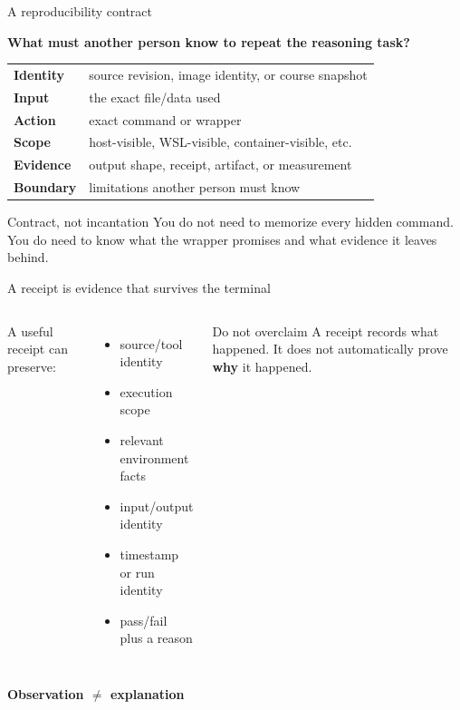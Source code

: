 \documentclass[aspectratio=169,11pt]{beamer}
\newcommand{\bigquestion}[1]{%
  \begin{center}
  \vspace{0.15em}
  {\Large\bfseries\color{DeepNavy}#1}
  \end{center}
}
\begin{document}
\begin{frame}{A reproducibility contract}
\bigquestion{What must another person know to repeat the reasoning task?}

\begin{center}
\begin{tabular}{>{\bfseries}p{3.0cm} p{8.3cm}}
\toprule
Identity & source revision, image identity, or course snapshot \\
Input & the exact file/data used \\
Action & exact command or wrapper \\
Scope & host-visible, WSL-visible, container-visible, etc. \\
Evidence & output shape, receipt, artifact, or measurement \\
Boundary & limitations another person must know \\
\bottomrule
\end{tabular}
\end{center}

\begin{block}{Contract, not incantation}
You do not need to memorize every hidden command. You do need to know what the wrapper promises and what evidence it leaves behind.
\end{block}
\end{frame}

\begin{frame}{A receipt is evidence that survives the terminal}
\begin{columns}[T,onlytextwidth]
A useful receipt can preserve:
\begin{itemize}
  \item source/tool identity
  \item execution scope
  \item relevant environment facts
  \item input/output identity
  \item timestamp or run identity
  \item pass/fail plus a reason
\end{itemize}

\begin{alertblock}{Do not overclaim}
A receipt records what happened. It does not automatically prove \textbf{why} it happened.
\end{alertblock}
\end{columns}

\vspace{0.35cm}
\begin{center}
\Large\bfseries Observation $\neq$ explanation
\end{center}
\end{frame}
\end{document}
